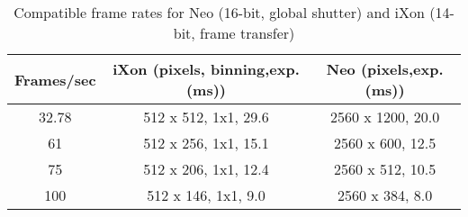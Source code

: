 \begin{table}\centering
\caption{Compatible frame rates for Neo (16-bit, global shutter) and iXon (14-bit, frame transfer)}
\label{tab:compFPS}
\begin{tabular}{ccc}
\toprule
Frames/sec & iXon (pixels, binning,exp.(ms)) & Neo (pixels,exp.(ms)) \\
\midrule
32.78 & 512 x 512, 1x1, 29.6 & 2560 x 1200, 20.0 \\
61 & 512 x 256, 1x1, 15.1 & 2560 x 600, 12.5 \\
75 & 512 x 206, 1x1, 12.4 & 2560 x 512, 10.5 \\
100 & 512 x 146, 1x1, 9.0 & 2560 x 384, 8.0 \\
\bottomrule
\end{tabular}

\end{table}
